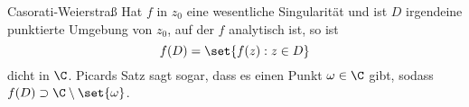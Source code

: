\begin{karte}{Casorati-Weierstraß}
    Hat \(f\) in \(z_0\) eine wesentliche Singularität und ist \(D\) 
    irgendeine punktierte Umgebung von \(z_0\), auf der \(f\) analytisch 
    ist, so ist 
    \[ f(D) = \set{f(z) : z\in D} \]
    dicht in \(\C\).
    Picards Satz sagt sogar, dass es einen Punkt \(\omega \in \C\) gibt, 
    sodass \(f(D) \supset \C \setminus \set{\omega}\).
\end{karte}